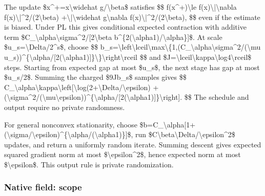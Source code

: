 \documentclass[10pt,a4paper]{article}
\begin{document}
The update \$x\textasciicircum{}+=x\textbackslash{}widehat g/\textbackslash{}beta\$ satisfies
\$\$
f(x\textasciicircum{}+)\textbackslash{}le f(x)\textbackslash{}|\textbackslash{}nabla f(x)\textbackslash{}|\textasciicircum{}2/(2\textbackslash{}beta)
+\textbackslash{}|\textbackslash{}widehat g\textbackslash{}nabla f(x)\textbackslash{}|\textasciicircum{}2/(2\textbackslash{}beta),
\$\$
even if the estimate is biased. Under PL this gives conditional expected contraction with additive term
\$C\_\textbackslash{}alpha\textbackslash{}sigma\textasciicircum{}2/[2\textbackslash{}beta b\textasciicircum{}\{2(\textbackslash{}alpha1)/\textbackslash{}alpha\}]\$.
At scale \$u\_s=\textbackslash{}Delta/2\textasciicircum{}s\$, choose
\$\$
b\_s=\textbackslash{}left\textbackslash{}lceil\textbackslash{}max\textbackslash{}\{1,(\allowbreak{}C\_\textbackslash{}alpha\textbackslash{}sigma\textasciicircum{}2/(\textbackslash{}mu u\_s))\textasciicircum{}\{\textbackslash{}alpha/[2(\textbackslash{}alpha\allowbreak{}1)]\}\textbackslash{}\}\textbackslash{}right\textbackslash{}rceil
\$\$
and \$J=\textbackslash{}lceil\textbackslash{}kappa\textbackslash{}log4\textbackslash{}rceil\$ steps. Starting from expected gap at most \$u\_s\$, the next stage has gap at most \$u\_s/2\$. Summing the charged \$9Jb\_s\$ samples gives
\$\$
C\_\textbackslash{}alpha\textbackslash{}kappa\textbackslash{}left[\textbackslash{}log\allowbreak{}(2+\textbackslash{}Delta/\textbackslash{}epsilon)
+(\textbackslash{}sigma\textasciicircum{}2/(\textbackslash{}mu\textbackslash{}epsilon)\allowbreak{})\textasciicircum{}\{\textbackslash{}alpha/[2(\textbackslash{}alpha1)]\}\allowbreak{}\textbackslash{}right].
\$\$
The schedule and output require no private randomness.

For general nonconvex stationarity, choose
\$b=C\_\textbackslash{}alpha[1+(\textbackslash{}sigma/\textbackslash{}e\allowbreak{}psilon)\textasciicircum{}\{\textbackslash{}alpha/(\textbackslash{}alpha\allowbreak{}1)\}]\$,
run \$C\textbackslash{}beta\textbackslash{}Delta/\textbackslash{}epsilon\textasciicircum{}2\$ updates, and return a uniformly random iterate. Summing descent gives expected squared gradient norm at most \$\textbackslash{}epsilon\textasciicircum{}2\$, hence expected norm at most \$\textbackslash{}epsilon\$. This output rule is private randomization.


\subsubsection{Native field: scope}
\end{document}

